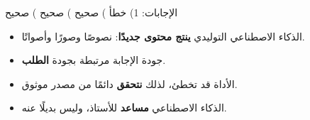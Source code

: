 \documentclass[a4paper]{article}
\begin{document}
{\small\color{ramadi} الإجابات: 1) خطأ ) صحيح ) صحيح ) صحيح}

\begin{khulasa}
\begin{itemize}
    \item الذكاء الاصطناعي التوليدي \textbf{ينتج محتوى جديدًا}:
          نصوصًا وصورًا وأصواتًا.
    \item جودة الإجابة مرتبطة بجودة \textbf{الطلب}.
    \item الأداة قد تخطئ، لذلك \textbf{نتحقق} دائمًا من مصدر موثوق.
    \item الذكاء الاصطناعي \textbf{مساعد} للأستاذ، وليس بديلًا عنه.
\end{itemize}
\end{khulasa}
\end{document}
